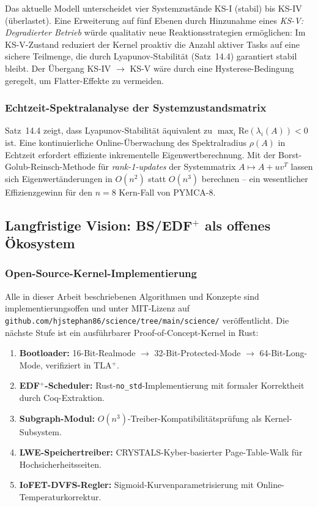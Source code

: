 ﻿\documentclass[a4paper,12pt]{scrreprt}
\theoremstyle{definition}
\begin{document}
	Das aktuelle Modell \cite{Epp2026sysstate} unterscheidet vier
	Systemzustände KS-I (stabil) bis KS-IV (überlastet). Eine Erweiterung
	auf fünf Ebenen durch Hinzunahme eines \emph{KS-V: Degradierter
		Betrieb} würde qualitativ neue Reaktionsstrategien ermöglichen:
	Im KS-V-Zustand reduziert der Kernel proaktiv die Anzahl aktiver
	Tasks auf eine sichere Teilmenge, die durch Lyapunov-Stabilität
	(Satz~14.4) garantiert stabil bleibt. Der Übergang KS-IV $\to$
	KS-V wäre durch eine Hysterese-Bedingung geregelt, um Flatter-Effekte
	zu vermeiden.
	
	\subsubsection{Echtzeit-Spektralanalyse der Systemzustands\-matrix}
	
	Satz~14.4 zeigt, dass Lyapunov-Stabilität äquivalent zu
	$\max_i \mathrm{Re}(\lambda_i(A)) < 0$ ist. Eine kontinuierliche
	Online-Überwachung des Spektralradius $\rho(A)$ in Echtzeit erfordert
	effiziente inkrementelle Eigenwertberechnung. Mit der
	Borst-Golub-Reinsch-Methode für \emph{rank-1-updates} der
	Systemmatrix $A \mapsto A + uv^T$ lassen sich
	Eigenwertänderungen in $O(n^2)$ statt $O(n^3)$ berechnen --
	ein wesentlicher Effizienzgewinn für den $n = 8$ Kern-Fall
	von PYMCA-8.
	
	\subsection{Langfristige Vision: BS/EDF\texorpdfstring{$^+$}{+} als offenes Ökosystem}
	
	\subsubsection{Open-Source-Kernel-Implementierung}
	
	Alle in dieser Arbeit beschriebenen Algorithmen und Konzepte sind
	implementierungsoffen und unter MIT-Lizenz auf
	\texttt{github.com/hjstephan86/science/tree/main/science/} veröffentlicht. Die nächste Stufe
	ist ein ausführbarer Proof-of-Concept-Kernel in Rust:
	
	\begin{enumerate}
		\item \textbf{Bootloader:} 16-Bit-Realmode $\to$ 32-Bit-Protected-Mode
		$\to$ 64-Bit-Long-Mode, verifiziert in TLA$^+$.
		\item \textbf{EDF$^+$-Scheduler:} Rust-\texttt{no\_std}-Implementierung
		mit formaler Korrektheit durch Coq-Extraktion.
		\item \textbf{Subgraph-Modul:} $O(n^3)$-Treiber-Kompatibilitätsprüfung
		als Kernel-Subsystem.
		\item \textbf{LWE-Speichertreiber:} CRYSTALS-Kyber-basierter
		Page-Table-Walk für Hochsicherheitsseiten.
		\item \textbf{IoFET-DVFS-Regler:} Sigmoid-Kurvenparametrisierung
		mit Online-Temperatur\-korrektur.
	\end{enumerate}
	
\end{document}
